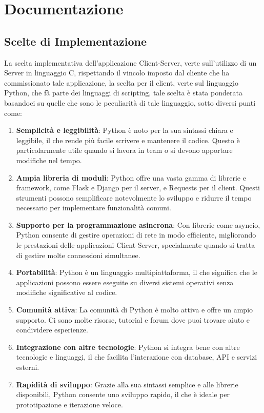 \chapter{Documentazione}
\section{Scelte di Implementazione}
La scelta implementativa dell'applicazione Client-Server, verte sull'utilizzo di un Server in linguaggio C, rispettando il vincolo imposto dal cliente che ha commissionato tale applicazione, la scelta per il client, verte sul linguaggio Python, che fà parte dei linguaggi di scripting, tale scelta è stata ponderata basandoci su quelle che sono le peculiarità di tale linguaggio, sotto diversi punti come:
\begin{enumerate}
    \item \textbf{Semplicità e leggibilità}: Python è noto per la sua sintassi chiara e leggibile,                il che rende più facile scrivere e mantenere il codice. Questo è particolarmente                 utile quando si lavora in team o si devono apportare modifiche nel tempo.
    \item \textbf{Ampia libreria di moduli}: Python offre una vasta gamma di librerie e framework,
                come Flask e Django per il server, e Requests per il client. Questi strumenti possono semplificare notevolmente lo sviluppo e ridurre il tempo necessario per implementare funzionalità comuni.
    \item \textbf{Supporto per la programmazione asincrona}: Con librerie come asyncio, Python                    consente di gestire operazioni di rete in modo efficiente, migliorando le                        prestazioni delle applicazioni Client-Server, specialmente quando si tratta di                   gestire molte connessioni simultanee.
    \item \textbf{Portabilità}: Python è un linguaggio multipiattaforma, il che significa che le                   applicazioni possono essere eseguite su diversi sistemi operativi senza modifiche                significative al codice.
    \item \textbf{Comunità attiva}: La comunità di Python è molto attiva e offre un ampio supporto.                Ci sono molte risorse, tutorial e forum dove puoi trovare aiuto e condividere                    esperienze.
    \item \textbf{Integrazione con altre tecnologie}: Python si integra bene con altre tecnologie e               linguaggi, il che facilita l'interazione con database, API e servizi esterni.
    \newpage 
    \item \textbf{Rapidità di sviluppo}: Grazie alla sua sintassi semplice e alle librerie disponibili, Python consente uno sviluppo rapido, il che è ideale per prototipazione e iterazione veloce.
\end{enumerate}
